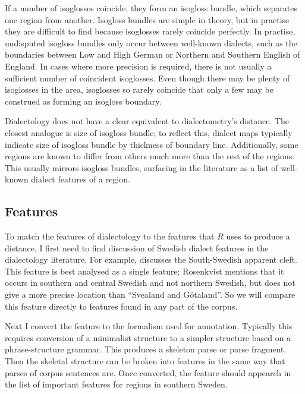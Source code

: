 If a number of isoglosses coincide, they form an isogloss bundle,
which separates one region from another. Isogloss bundles are simple
in theory, but in practise they are difficult to find because
isoglosses rarely coincide perfectly. In practise, undisputed isogloss
bundles only occur between well-known dialects, such as the
boundaries between Low and High German or Northern and Southern
English of England. In cases where more precision is required, there
is not usually a sufficient number of coincident isoglosses. Even
though there may be plenty of isoglosses in the area, isoglosses so
rarely coincide that only a few may be construed as forming an
isogloss boundary.

Dialectology does not have a clear equivalent to dialectometry's
distance. The closest analogue is size of isogloss bundle; to reflect
this, dialect maps typically indicate size of isogloss bundle by
thickness of boundary line. Additionally, some regions are known to differ from
others much more than the rest of the regions. This usually mirrors
isogloss bundles, surfacing in the literature as a list of well-known
dialect features of a region.

\subsection{Features}

To match the features of dialectology to the features that $R$ uses to
produce a distance, I first need to find discussion of Swedish dialect
features in the dialectology literature. For example,
 discusses the South-Swedish apparent
cleft. This feature is best analysed as a single feature; Rosenkvist
mentions that it occurs in southern and central Swedish and not
northern Swedish, but does not give a more precise location than
``Svealand and G\"otaland''. So we will compare this feature directly
to features found in any part of the corpus.

Next I convert the feature to the formalism used for annotation.
Typically this requires conversion of a minimalist structure to a
simpler structure based on a phrase-structure grammar. This produces a
skeleton parse or parse fragment. Then the skeletal structure can be
broken into features in the same way that parses of corpus sentences
are. Once converted, the feature should appearch in the list of
important features for regions in southern Sweden.

